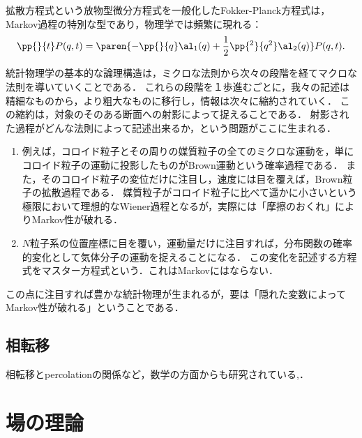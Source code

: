 \documentclass[uplatex,dvipdfmx]{jsreport}
\begin{document}
\begin{model}
    拡散方程式という放物型微分方程式を一般化したFokker-Planck方程式は，Markov過程の特別な型であり，物理学では頻繁に現れる：
    \[\pp{}{t}P(q,t)=\paren{-\pp{}{q}\al_1(q)+\frac{1}{2}\pp{^2}{q^2}\al_2(q)}P(q,t).\]
\end{model}

\begin{remarks}[情報の縮約がMarkovを破る]
    統計物理学の基本的な論理構造は，ミクロな法則から次々の段階を経てマクロな法則を導いていくことである．
    これらの段階を１歩進むごとに，我々の記述は精細なものから，より粗大なものに移行し，情報は次々に縮約されていく．
    この縮約は，対象のそのある断面への射影によって捉えることである．
    射影された過程がどんな法則によって記述出来るか，という問題がここに生まれる．
    \begin{enumerate}
        \item 例えば，コロイド粒子とその周りの媒質粒子の全てのミクロな運動を，単にコロイド粒子の運動に投影したものがBrown運動という確率過程である．
        また，そのコロイド粒子の変位だけに注目し，速度には目を覆えば，Brown粒子の拡散過程である．
        媒質粒子がコロイド粒子に比べて遥かに小さいという極限において理想的なWiener過程となるが，実際には「摩擦のおくれ」によりMarkov性が破れる．
        \item $N$粒子系の位置座標に目を覆い，運動量だけに注目すれば，分布関数の確率的変化として気体分子の運動を捉えることになる．
        この変化を記述する方程式をマスター方程式という．これはMarkovにはならない．
    \end{enumerate}
    この点に注目すれば豊かな統計物理が生まれるが，要は「隠れた変数によってMarkov性が破れる」ということである．
\end{remarks}

\section{相転移}

\begin{tcolorbox}[colframe=ForestGreen, colback=ForestGreen!10!white,breakable,colbacktitle=ForestGreen!40!white,coltitle=black,fonttitle=\bfseries\sffamily,
title=]
    相転移とpercolationの関係など，数学の方面からも研究されている\cite{宮本},\cite{Robert Minlos}．
\end{tcolorbox}

\chapter{場の理論}
\end{document}
